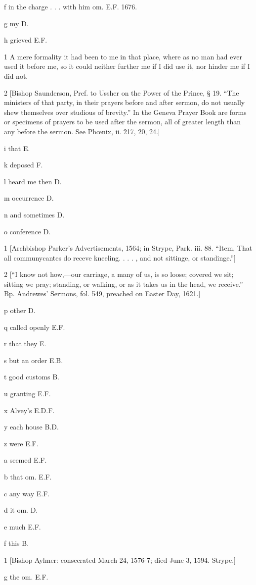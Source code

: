 f
in the charge . . . with him om. E.F. 1676.

g
my D.

h
grieved E.F.

1
A mere formality it had been to me in that place, where as no man had ever used it before me, so it could neither further me if I did use it, nor hinder me if I did not.

2
[Bishop Saunderson, Pref. to Ussher on the Power of the Prince, § 19. “The ministers of that party, in their prayers before and after sermon, do not usually shew themselves over studious of brevity.” In the Geneva Prayer Book are forms or specimens of prayers to be used after the sermon, all of greater length than any before the sermon. See Phœnix, ii. 217, 20, 24.]

i
that E.

k
deposed F.

l
heard me then D.

m
occurrence D.

n
and sometimes D.

o
conference D.

1
[Archbishop Parker’s Advertisements, 1564; in Strype, Park. iii. 88. “Item, That all communycantes do receve kneeling. . . . , and not sittinge, or standinge.”]

2
[“I know not how,—our carriage, a many of us, is so loose; covered we sit; sitting we pray; standing, or walking, or as it takes us in the head, we receive.” Bp. Andrewes’ Sermons, fol. 549, preached on Easter Day, 1621.]

p
other D.

q
called openly E.F.

r
that they E.

s
but an order E.B.

t
good customs B.

u
granting E.F.

x
Alvey’s E.D.F.

y
each house B.D.

z
were E.F.

a
seemed E.F.

b
that om. E.F.

c
any way E.F.

d
it om. D.

e
much E.F.

f
this B.

1
[Bishop Aylmer: consecrated March 24, 1576-7; died June 3, 1594. Strype.]

g
the om. E.F.

